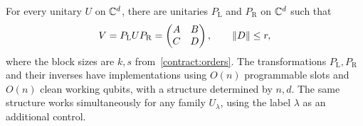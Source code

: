 \begin{proposition}\label{contract:block}
For every unitary $U$ on $\mathbb C^d$, there are unitaries $P_{\mathrm L}$ and
$P_{\mathrm R}$ on $\mathbb C^d$ such that
\begin{equation}\label{contract:block-form}
 V=P_{\mathrm L}UP_{\mathrm R}
 =\begin{pmatrix}A&B\\C&D\end{pmatrix},
 \qquad \lVert D\rVert\leq r,
\end{equation}
where the block sizes are $k,s$ from~\eqref{contract:orders}.
The transformations $P_{\mathrm L},P_{\mathrm R}$ and their inverses have
implementations using $O(n)$ programmable slots and $O(n)$ clean working
qubits, with a structure determined by $n,d$.  The same structure works
simultaneously for any family $U_\lambda$, using the label $\lambda$ as an
additional control.
\end{proposition}

